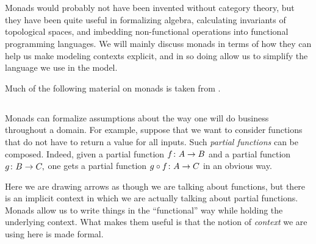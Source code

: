 \documentclass[../main/CT4S-EN-RU]{subfiles}
\begin{document}
\section{}\label{sec:monads}

\begin{blockENG}
Monads would probably not have been invented without category theory, but they have been quite useful in formalizing algebra, calculating invariants of topological spaces, and imbedding non-functional operations into functional programming languages. We will mainly discuss monads in terms of how they can help us make modeling contexts explicit, and in so doing allow us to simplify the language we use in the model.
\end{blockENG}

\begin{blockRUS}
\end{blockRUS}

\begin{blockENG}
Much of the following material on monads is taken from \cite{Sp3}.
\end{blockENG}

\begin{blockRUS}
\end{blockRUS}


\subsection{}

\begin{blockENG}
Monads can formalize assumptions about the way one will do business throughout a domain. For example, suppose that we want to consider functions that do not have to return a value for all inputs. Such {\em partial functions} can be composed. Indeed, given a partial function $f\colon A\rightarrow B$ and a partial function $g\colon B\rightarrow C,$ one gets a partial function $g\circ f\colon A\rightarrow C$ in an obvious way.
\end{blockENG}

\begin{blockRUS}
\end{blockRUS}

\begin{blockENG}
Here we are drawing arrows as though we are talking about functions, but there is an implicit context in which we are actually talking about partial functions. Monads allow us to write things in the “functional” way while holding the underlying context. What makes them useful is that the notion of {\em context} we are using here is made formal.
\end{blockENG}
\end{document}
